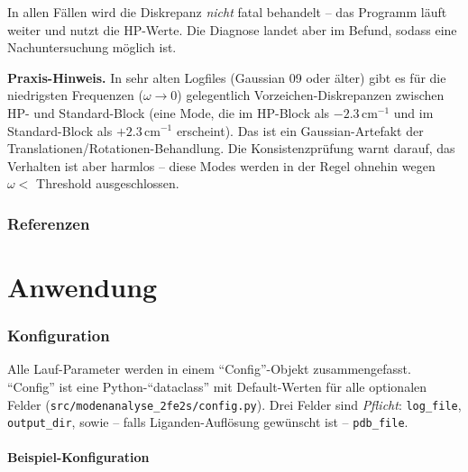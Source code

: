 \documentclass[11pt,a4paper,twoside]{article}
\theoremstyle{remark}
\begin{document}
In allen F\"allen wird die Diskrepanz \emph{nicht} fatal behandelt --
das Programm l\"auft weiter und nutzt die HP-Werte. Die Diagnose
landet aber im Befund, sodass eine Nachuntersuchung m\"oglich ist.

\begin{warnbox}
\textbf{Praxis-Hinweis.} In sehr alten Logfiles (Gaussian 09 oder
\"alter) gibt es f\"ur die niedrigsten Frequenzen ($\omega \to 0$)
gelegentlich Vorzeichen-Diskrepanzen zwischen HP- und Standard-Block
(eine Mode, die im HP-Block als $-2.3$\,cm$^{-1}$ und im Standard-Block
als $+2.3$\,cm$^{-1}$ erscheint). Das ist ein Gaussian-Artefakt der
Translationen/Rotationen-Behandlung. Die Konsistenzpr\"ufung warnt
darauf, das Verhalten ist aber harmlos -- diese Modes werden in der
Regel ohnehin wegen $\omega < $ Threshold ausgeschlossen.
\end{warnbox}


\clearpage
\section*{Referenzen}

\part{Anwendung}

\section{Konfiguration}
\label{sec:konfig}

Alle Lauf-Parameter werden in einem ``Config''-Objekt zusammengefasst.
``Config'' ist eine Python-``dataclass'' mit Default-Werten f\"ur alle
optionalen Felder (\texttt{src/modenanalyse\_2fe2s/config.py}). Drei
Felder sind \emph{Pflicht}: \texttt{log\_file}, \texttt{output\_dir},
sowie -- falls Liganden-Aufl\"osung gew\"unscht ist --
\texttt{pdb\_file}.

\subsection{Beispiel-Konfiguration}
\end{document}
